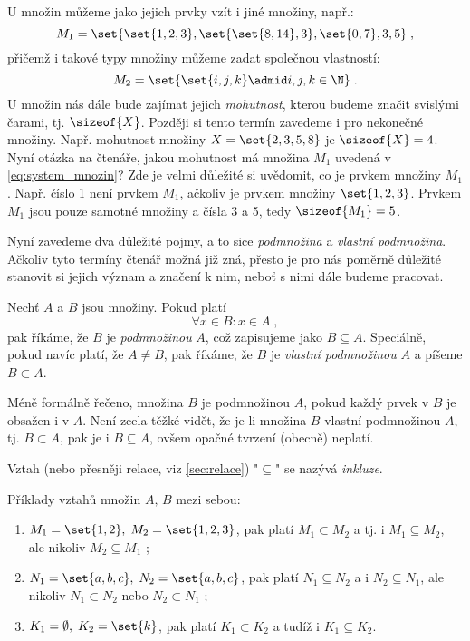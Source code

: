 U množin můžeme jako jejich prvky vzít i jiné množiny, např.:
\begin{equation}\label{eq:system_mnozin}
    M_1=\set{\set{1,2,3},\set{\set{8,14},3},\set{0,7}, 3, 5}\; ,
\end{equation}
přičemž i takové typy množiny můžeme zadat společnou vlastností:
\begin{equation*}
    M_2=\set{\set{i,j,k} \admid i,j,k\in\N}\; .
\end{equation*}
U množin nás dále bude zajímat jejich \emph{mohutnost}, kterou budeme značit svislými čarami, tj. $\sizeof{X}$. Později si tento termín zavedeme i pro nekonečné množiny. Např. mohutnost množiny $X=\set{2,3,5,8}$ je $\sizeof{X}=4$. Nyní otázka na čtenáře, jakou mohutnost má množina $M_1$ uvedená v \eqref{eq:system_mnozin}? Zde je velmi důležité si uvědomit, co je prvkem množiny $M_1$. Např. číslo 1 není prvkem $M_1$, ačkoliv je prvkem množiny $\set{1,2,3}$. Prvkem $M_1$ jsou pouze samotné množiny a čísla 3 a 5, tedy $\sizeof{M_1}=5$.\par
\medskip
Nyní zavedeme dva důležité pojmy, a to sice \emph{podmnožina} a \emph{vlastní podmnožina}. Ačkoliv tyto termíny čtenář možná již zná, přesto je pro nás poměrně důležité stanovit si jejich význam a značení k nim, neboť s nimi dále budeme pracovat.
\begin{definition}\label{def:podmnozina}
    Nechť $A$ a $B$ jsou množiny. Pokud platí
    \begin{equation*}
        \forall x\in B: x\in A\; ,
    \end{equation*}
    pak říkáme, že $B$ je \emph{podmnožinou} $A$, což zapisujeme jako $B \subseteq A$. Speciálně, pokud navíc platí, že $A \neq B$, pak říkáme, že $B$ je \emph{vlastní podmnožinou} $A$ a píšeme $B \subset A$.
\end{definition}
Méně formálně řečeno, množina $B$ je podmnožinou $A$, pokud každý prvek v $B$ je obsažen i v $A$. Není zcela těžké vidět, že je-li množina $B$ vlastní podmnožinou $A$, tj. $B \subset A$, pak je i $B \subseteq A$, ovšem opačné tvrzení (obecně) neplatí.
\begin{remark}
    Vztah (nebo přesněji relace, viz \ref{sec:relace}) "$\subseteq$" se nazývá \emph{inkluze}.
\end{remark}
\begin{example}
    Příklady vztahů množin $A,\,B$ mezi sebou:
    \begin{enumerate}[label=(\roman*)]
        \item $M_1=\set{1,2},\; M_2=\set{1,2,3}$, pak platí $M_1 \subset M_2$ a tj. i $M_1 \subseteq M_2$, ale nikoliv $M_2 \subseteq M_1$ ;
        \item $N_1=\set{a,b,c},\; N_2=\set{a,b,c}$, pak platí $N_1 \subseteq N_2$ a i $N_2 \subseteq N_1$, ale nikoliv $N_1 \subset N_2$ nebo $N_2 \subset N_1$ ;
        \item $K_1=\emptyset,\; K_2=\set{k}$, pak platí $K_1 \subset K_2$ a tudíž i $K_1 \subseteq K_2$.
    \end{enumerate}
\end{example}
